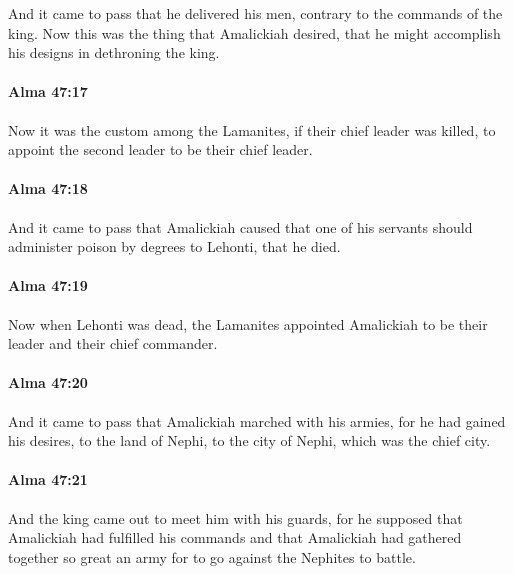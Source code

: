 			And it came to pass that he delivered his men,
			contrary to the commands of the king.
			Now this was the thing that Amalickiah desired,
			that he might accomplish his designs in dethroning the king.

		\paragraph{Alma 47:17} %
			\label{ALMA-47-17}

			Now it was the custom among the Lamanites,
			if their chief leader was killed,
			to appoint the second leader to be their chief leader.

		\paragraph{Alma 47:18} %
			\label{ALMA-47-18}

			And it came to pass that Amalickiah caused
			that one of his servants should administer poison by degrees to Lehonti,
			that he died.

		\paragraph{Alma 47:19} %
			\label{ALMA-47-19}

			Now when Lehonti was dead,
			the Lamanites appointed Amalickiah to be their leader and their chief commander.

		\paragraph{Alma 47:20} %
			\label{ALMA-47-20}

			And it came to pass that Amalickiah marched with his armies,
			for he had gained his desires,
			to the land of Nephi, to the city of Nephi, which was the chief city.

		\paragraph{Alma 47:21} %
			\label{ALMA-47-21}

			And the king came out to meet him with his guards,
			for he supposed that Amalickiah had fulfilled his commands
			and that Amalickiah had gathered together so great an army
			for to go against the Nephites to battle.

